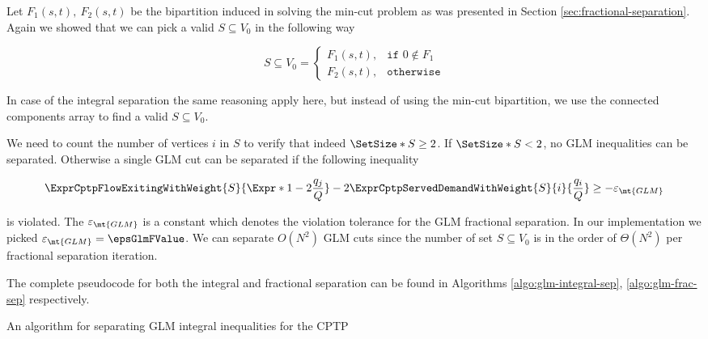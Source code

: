 Let $F_1(s, t),\ F_2(s, t)$ be the bipartition induced in solving the min-cut problem as was presented in Section \ref{sec:fractional-separation}.
Again we showed that we can pick a valid $S \subseteq V_0$ in the following way

\begin{equation}
	S \subseteq V_0 =
	\begin{cases}
		F_1(s, t), & \texttt{if } 0 \notin F_1 \\
		F_2(s, t), & \texttt{otherwise}
	\end{cases}
\end{equation}

In case of the integral separation the same reasoning apply here, but instead of using the min-cut bipartition, we use the connected components array to find a valid $S \subseteq V_0$.

We need to count the number of vertices $i$ in $S$ to verify that indeed $\SetSize*{S} \ge 2$.
If $\SetSize*{S} < 2$, no GLM inequalities can be separated.
Otherwise a single GLM cut can be separated if the following inequality

\begin{equation}
	\begin{split}
		\ExprCptpFlowExitingWithWeight{S}{\Expr*{1 - 2 \frac{q_j}{Q}}} - 2 	\ExprCptpServedDemandWithWeight{S}{i}{\frac{q_i}{Q}} \ge - \varepsilon_{\mt{GLM}}
	\end{split}
\end{equation}

is violated.
The $\varepsilon_{\mt{GLM}}$ is a constant which denotes the violation tolerance for the GLM fractional separation.
In our implementation we picked $\varepsilon_{\mt{GLM}} = \epsGlmFValue$.
We can separate $O(N^2)$ GLM cuts since the number of set $S \subseteq V_0$ is in the order of $\Theta(N^2)$ per fractional separation iteration.

The complete pseudocode for both the integral and fractional separation can be found in Algorithms \ref{algo:glm-integral-sep}, \ref{algo:glm-frac-sep} respectively.

\begin{algorithm}
	\caption{An algorithm for separating GLM integral inequalities for the CPTP}
	\label{algo:glm-integral-sep}
	
\end{algorithm}

